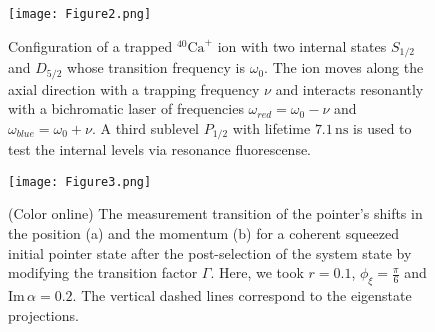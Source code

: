 \documentclass[aps,pra,preprint,superscriptaddress, showpacs]{revtex4-2}
\begin{document}
\begin{figure}[h!]
	\centering
	\texttt{[image: Figure2.png]}
	\caption{Configuration of a trapped ${}^{40}\text{Ca}^{+}$ ion with two internal states $S_{1/2}$ and $D_{5/2}$ whose transition frequency is $\omega_{0}$. The ion moves along the axial direction with a trapping frequency $\nu$ and interacts resonantly with a bichromatic laser of frequencies $\omega_{red}=\omega_{0}-\nu$ and $\omega_{blue}=\omega_{0}+\nu$. A third sublevel $P_{1/2}$ with lifetime $7.1\,\text{ns}$ is used to test the internal levels via resonance fluorescense.}
	\label{fig2}
\end{figure}


\begin{figure}[h!]
	\centering
	\texttt{[image: Figure3.png]}
	\caption{(Color online) The measurement transition of the pointer's shifts in the position (a) and the momentum (b) for a coherent squeezed initial pointer state after the post-selection of the system state by modifying the transition factor $\Gamma$. Here, we took $r=0.1$, $\phi_{\xi}=\frac{\pi}{6}$ and $\textrm{Im}\,\alpha=0.2$. The vertical dashed lines correspond to the eigenstate projections.}
	\label{fig3}
\end{figure}
\end{document}
